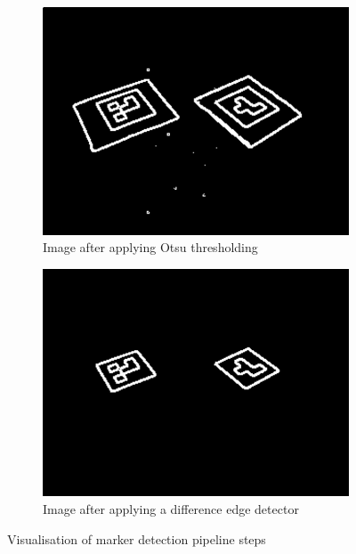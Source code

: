 \begin{figure}[thpb]
\begin{subfigure}[b]{0.45\columnwidth}
		\includegraphics[width=\columnwidth]{otsu.png}
		\caption{Image after applying Otsu thresholding}
		\label{fig:otsu}
	\end{subfigure}
	\begin{subfigure}[b]{0.45\columnwidth}
		\centering
		\includegraphics[width=\columnwidth]{edge.png}
		\caption{Image after applying a difference edge detector} \label{fig:finalmarker}
	\end{subfigure}
	\caption{Visualisation of marker detection pipeline steps}
	\label{fig:markerdetection}
\end{figure}

